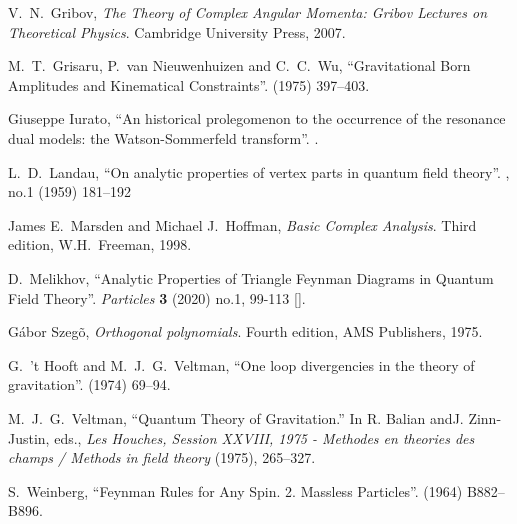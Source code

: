 \begin{thebibliography}{99}
V.~N.~Gribov,
\emph{The Theory of Complex Angular Momenta: Gribov Lectures on Theoretical Physics}.
Cambridge University Press, 2007.\newline
{\tt{}}

M.~T.~Grisaru, P.~van Nieuwenhuizen and C.~C.~Wu,
``Gravitational Born Amplitudes and Kinematical Constraints''.
  (1975) 397--403.\newline
{\tt{}}

  Giuseppe Iurato,
  ``An historical prolegomenon to the occurrence of the resonance dual models: the Watson-Sommerfeld transform''.
  .

L.~D.~Landau,
``On analytic properties of vertex parts in quantum field theory''.
 , no.1 (1959) 181--192\newline
{\tt{}}
  
  James E.~Marsden and Michael J.~Hoffman,
  \emph{Basic Complex Analysis}.
  Third edition, W.H.~Freeman, 1998.

D.~Melikhov,
``Analytic Properties of Triangle Feynman Diagrams in Quantum Field Theory''.
\textit{Particles} \textbf{3} (2020) no.1, 99-113
{\tt{}}
[].

  G\'abor Szeg\~o,
  \emph{Orthogonal polynomials}.
  Fourth edition, AMS Publishers, 1975.

G.~'t Hooft and M.~J.~G.~Veltman,
``One loop divergencies in the theory of gravitation''.
  (1974) 69--94.

M.~J.~G.~Veltman,
``Quantum Theory of Gravitation.''
In R. Balian andJ. Zinn-Justin, eds.,
\emph{Les Houches, Session XXVIII, 1975 - Methodes en theories des champs / Methods in field theory}
(1975), 265--327.

S.~Weinberg,
``Feynman Rules for Any Spin. 2. Massless Particles''.
  (1964) B882--B896.\newline
{\tt{}}


\end{thebibliography}
